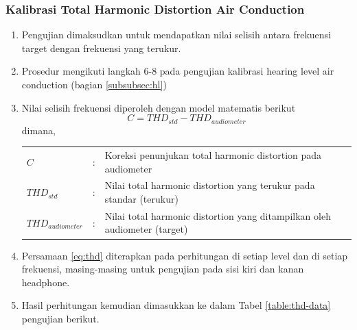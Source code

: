 \documentclass{article}
\begin{document}
	\subsubsection{Kalibrasi Total Harmonic Distortion Air Conduction}
	\begin{enumerate}
		\item Pengujian dimaksudkan untuk mendapatkan nilai selisih antara frekuensi target dengan frekuensi yang terukur. 
		\item Prosedur mengikuti langkah 6-8 pada pengujian kalibrasi hearing level air conduction (bagian \ref{subsubsec:hl}) 		
		\item Nilai selisih frekuensi diperoleh dengan model matematis berikut
		\begin{equation}
			\label{eq:thd}
			C = THD_{std} - THD_{audiometer}
		\end{equation}
		dimana, 
		
		\begin{tabular}{p{} p{} p{}}
			\(C\) & : & Koreksi penunjukan total harmonic distortion pada audiometer \\
			\(THD_{std}\) & : & Nilai total harmonic distortion yang terukur pada standar (terukur) \\
			\(THD_{audiometer}\) & : & Nilai total harmonic distortion yang ditampilkan oleh audiometer (target) \\
		\end{tabular}
		
		\item Persamaan \ref{eq:thd} diterapkan pada perhitungan di setiap level dan di setiap frekuensi, masing-masing untuk pengujian pada sisi kiri dan kanan headphone.
		
		\item Hasil perhitungan kemudian dimasukkan ke dalam Tabel \ref{table:thd-data} pengujian berikut.
		

\end{enumerate}
\end{document}
